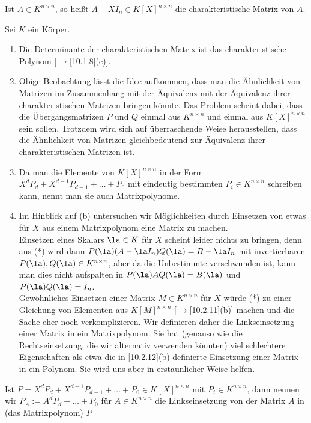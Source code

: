 \documentclass[../../main.tex]{subfiles}
\begin{document}
\begin{df}\label{17.4.3}
Ist $A\in K^{n\times n}$, so heißt $A-XI_n\in K[X]^{n\times n}$ die charakteristische Matrix von $A$.
\end{df}

\begin{bem}\label{17.4.4}
Sei $K$ ein Körper.
\begin{enumerate}[\normalfont(a)]
\item Die Determinante der charakteristischen Matrix ist das charakteristische Polynom [$\to$\ref{10.1.8}(e)].
\item Obige Beobachtung lässt die Idee aufkommen, dass man die Ähnlichkeit von Matrizen im Zusammenhang mit der Äquivalenz mit der Äquivalenz ihrer charakteristischen Matrizen bringen könnte. Das Problem scheint dabei, dass die Übergangsmatrizen $P$ und $Q$ einmal aus $K^{n\times n}$ und einmal aus $K[X]^{n\times n}$ sein sollen. Trotzdem wird sich auf überraschende Weise herausstellen, dass die Ähnlichkeit von Matrizen gleichbedeutend zur Äquivalenz ihrer charakteristischen Matrizen ist.
\item Da man die Elemente von $K[X]^{n\times n}$ in der Form $X^dP_d+X^{d-1}P_{d-1}+\ldots +P_0$ mit eindeutig bestimmten $P_i\in K^{n\times n}$ schreiben kann, nennt man sie auch Matrixpolynome.
\item Im Hinblick auf (b) untersuchen wir Möglichkeiten durch Einsetzen von etwas für $X$ aus einem Matrixpolynom eine Matrix zu machen. 
\\Einsetzen eines Skalars $\la\in K$ für $X$ scheint leider nichts zu bringen, denn aus (*) wird dann $P(\la)(A-\la I_n)Q(\la)=B-\la I_n$ mit invertierbaren $P(\la),Q(\la)\in K^{n\times n}$, aber da die Unbestimmte verschwunden ist, kann man dies nicht aufspalten in $P(\la)AQ(\la)=B(\la)$ und $P(\la)Q(\la)=I_n$. 
\\Gewöhnliches Einsetzen einer Matrix $M\in K^{n\times n}$ für $X$ würde (*) zu einer Gleichung von Elementen aus $K[M]^{n\times n}$ [$\to$\ref{10.2.11}(b)] machen und die Sache eher noch verkomplizieren. Wir definieren daher die Linkseinsetzung einer Matrix in ein Matrixpolynom. Sie hat (genauso wie die Rechtseinsetzung, die wir alternativ verwenden könnten) viel schlechtere Eigenschaften als etwa die in \ref{10.2.12}(b) definierte Einsetzung einer Matrix in ein Polynom. Sie wird uns aber in erstaunlicher Weise helfen.
\end{enumerate}
\end{bem}

\begin{df}\label{17.4.5}
Ist $P=X^dP_d+X^{d-1}P_{d-1}+\ldots +P_0\in K[X]^{n\times n}$ mit $P_i\in K^{n\times n}$, dann nennen wir $P_A:=A^dP_d+\ldots +P_0$ für $A\in K^{n\times n}$ die Linkseinsetzung von der Matrix $A$ in (das Matrixpolynom) $P$
\end{df}
\end{document}
